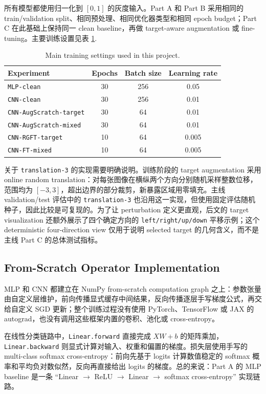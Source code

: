 \documentclass[12pt,a4paper,fontset=fandol]{ctexart}
\begin{document}
所有模型都使用归一化到 $[0,1]$ 的灰度输入。Part A 和 Part B 采用相同的 train/validation split、相同预处理、相同优化器类型和相同 epoch budget；Part C 在此基础上保持同一 clean baseline，再做 target-aware augmentation 或 fine-tuning。主要训练设置见表 \ref{tab:setup}.

\begin{table}[H]
  \centering
  \small
  \caption{Main training settings used in this project.}
  \label{tab:setup}
  \renewcommand{\arraystretch}{1.08}
  \begin{tabular}{lccc}
    \toprule
    Experiment & Epochs & Batch size & Learning rate \\
    \midrule
    \texttt{MLP-clean} & 30 & 256 & 0.05 \\
    \texttt{CNN-clean} & 30 & 256 & 0.01 \\
    \texttt{CNN-AugScratch-target} & 30 & 64 & 0.01 \\
    \texttt{CNN-AugScratch-mixed} & 30 & 64 & 0.01 \\
    \texttt{CNN-RGFT-target} & 10 & 64 & 0.005 \\
    \texttt{CNN-FT-mixed} & 10 & 64 & 0.005 \\
    \bottomrule
  \end{tabular}
\end{table}

关于 \texttt{translation-3} 的实现需要明确说明。训练阶段的 target augmentation 采用 online random translation：对每张图像在横纵两个方向分别随机采样整数位移，范围均为 $[-3, 3]$，超出边界的部分裁剪，新暴露区域用零填充。主线 validation/test 评估中的 \texttt{translation-3} 也沿用这一实现，但使用固定评估随机种子，因此比较是可复现的。为了让 perturbation 定义更直观，后文的 target visualization 还额外展示了四个确定方向的 \texttt{left/right/up/down} 平移示例；这个 deterministic four-direction view 仅用于说明 selected target 的几何含义，而不是主线 Part C 的总体测试指标。

\subsection{From-Scratch Operator Implementation}

MLP 和 CNN 都建立在 NumPy from-scratch computation graph 之上：参数张量由自定义层维护，前向传播显式缓存中间结果，反向传播逐层手写梯度公式，再交给自定义 SGD 更新；整个训练过程没有使用 PyTorch、TensorFlow 或 JAX 的 autograd，也没有调用这些框架内置的卷积、池化或 cross-entropy。

在线性分类链路中，\texttt{Linear.forward} 直接完成 $XW+b$ 的矩阵乘加，\texttt{Linear.backward} 则显式计算对输入、权重和偏置的梯度。损失层使用手写的 multi-class softmax cross-entropy：前向先基于 logits 计算数值稳定的 softmax 概率和平均负对数似然，反向再直接给出 logits 的梯度。总的来说：Part A 的 MLP baseline 是一条 ``Linear $\rightarrow$ ReLU $\rightarrow$ Linear $\rightarrow$ softmax cross-entropy'' 实现链路。
\end{document}
